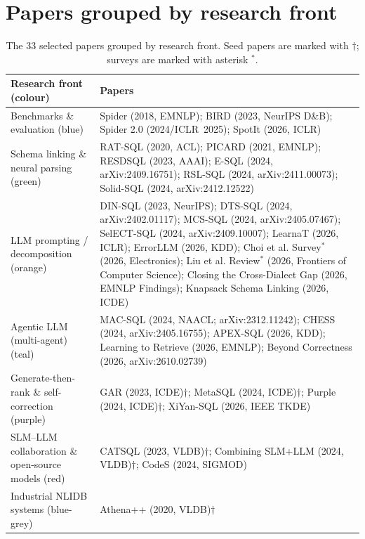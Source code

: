 \documentclass[11pt,a4paper]{article}
\begin{document}
\section{Papers grouped by research front}

\begin{table}[!htbp]
\centering
\caption{The 33 selected papers grouped by research front. Seed papers are
marked with $\dagger$; surveys are marked with asterisk $^{*}$.}
\label{tab:fronts}
\renewcommand{\arraystretch}{1.35}
\begin{tabular}{>{\raggedright\arraybackslash}p{5.4cm}
                >{\raggedright\arraybackslash}p{11.6cm}}
\toprule
\textbf{Research front (colour)} & \textbf{Papers} \\
\midrule
\rowcolor{cBench!10}
Benchmarks \& evaluation (blue)
  & Spider (2018, EMNLP); BIRD (2023, NeurIPS D\&B); Spider 2.0 (2024/ICLR~2025);
    SpotIt (2026, ICLR) \\
\rowcolor{cSchema!10}
Schema linking \& neural parsing (green)
  & RAT-SQL (2020, ACL); PICARD (2021, EMNLP); RESDSQL (2023, AAAI);
    E-SQL (2024, arXiv:2409.16751); RSL-SQL (2024, arXiv:2411.00073);
    Solid-SQL (2024, arXiv:2412.12522) \\
\rowcolor{cLLM!10}
LLM prompting / decomposition (orange)
  & DIN-SQL (2023, NeurIPS); DTS-SQL (2024, arXiv:2402.01117);
    MCS-SQL (2024, arXiv:2405.07467); SelECT-SQL (2024, arXiv:2409.10007);
    LearnaT (2026, ICLR); ErrorLLM (2026, KDD);
    Choi et al. Survey$^{*}$ (2026, Electronics);
    Liu et al. Review$^{*}$ (2026, Frontiers of Computer Science);
    Closing the Cross-Dialect Gap (2026, EMNLP Findings);
    Knapsack Schema Linking (2026, ICDE) \\
\rowcolor{cAgentic!10}
Agentic LLM (multi-agent) (teal)
  & MAC-SQL (2024, NAACL; arXiv:2312.11242); CHESS (2024, arXiv:2405.16755);
    APEX-SQL (2026, KDD); Learning to Retrieve (2026, EMNLP);
    Beyond Correctness (2026, arXiv:2610.02739) \\
\rowcolor{cRank!10}
Generate-then-rank \& self-correction (purple)
  & GAR (2023, ICDE)$\dagger$; MetaSQL (2024, ICDE)$\dagger$;
    Purple (2024, ICDE)$\dagger$; XiYan-SQL (2026, IEEE TKDE) \\
\rowcolor{cSLM!10}
SLM--LLM collaboration \& open-source models (red)
  & CATSQL (2023, VLDB)$\dagger$; Combining SLM+LLM (2024, VLDB)$\dagger$;
    CodeS (2024, SIGMOD) \\
\rowcolor{cInd!10}
Industrial NLIDB systems (blue-grey)
  & Athena++ (2020, VLDB)$\dagger$ \\
\bottomrule
\end{tabular}
\end{table}
\end{document}
